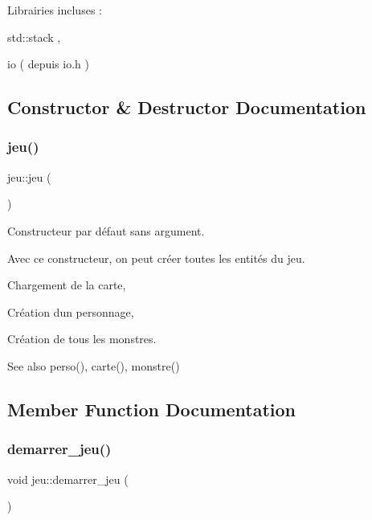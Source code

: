 Librairies incluses \+:
\begin{DoxyItemize}
\item std\+::stack ,
\item io ( depuis io.\+h ) 
\end{DoxyItemize}

\subsection{Constructor \& Destructor Documentation}
\mbox{\label{classjeu_a38513a7bfd0a7ea4e3a5612da2856016}} 
\subsubsection{\texorpdfstring{jeu()}{jeu()}}
{\footnotesize\ttfamily jeu\+::jeu (\begin{DoxyParamCaption}{ }\end{DoxyParamCaption})}



Constructeur par défaut sans argument. 

Avec ce constructeur, on peut créer toutes les entités du jeu.


\begin{DoxyItemize}
\item Chargement de la carte,
\item Création d\textquotesingle{}un personnage,
\item Création de tous les monstres.
\end{DoxyItemize}

\begin{DoxySeeAlso}{See also}
perso(), carte(), monstre() 
\end{DoxySeeAlso}


\subsection{Member Function Documentation}
\mbox{\label{classjeu_aabf11934ce63bc5d71bbd27e1523fc45}} 
\subsubsection{\texorpdfstring{demarrer\+\_\+jeu()}{demarrer\_jeu()}}
{\footnotesize\ttfamily void jeu\+::demarrer\+\_\+jeu (\begin{DoxyParamCaption}{ }\end{DoxyParamCaption})}



